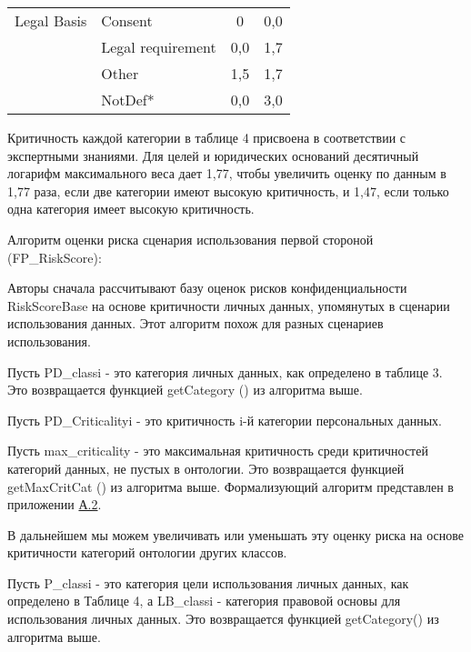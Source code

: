 \documentclass[../main]{subfiles}
\begin{document}
\begin{ltwrap}{2mm}{1.7}{\footnotesize}
\begin{longtable}[H]{|M{.15\x}|M{.3\x}|C{.15\x}|C{.15\x}|}
        Legal Basis
        & Consent
        & 0
        & 0,0\\
        

        & Legal requirement
        & 0,0
        & 1,7\\
        

        & Other
        & 1,5
        & 1,7\\
        

        & NotDef*
        & 0,0
        & 3,0\\\hline
        
    \end{longtable}
\end{ltwrap}

Критичность каждой категории в таблице 4 присвоена в соответствии с экспертными знаниями. Для целей и юридических оснований десятичный логарифм максимального веса дает 1,77, чтобы увеличить оценку по данным в 1,77 раза, если две категории имеют высокую критичность, и 1,47, если только одна категория имеет высокую критичность.

Алгоритм оценки риска сценария использования первой стороной (FP\_RiskScore):

Авторы сначала рассчитывают базу оценок рисков конфиденциальности RiskScoreBase на основе критичности личных данных, упомянутых в сценарии использования данных. Этот алгоритм похож для разных сценариев использования.

Пусть PD\_classi - это категория личных данных, как определено в таблице 3. Это возвращается функцией getCategory () из алгоритма выше.

Пусть PD\_Criticalityi - это критичность i-й категории персональных данных.

Пусть max\_criticality - это максимальная критичность среди критичностей категорий данных, не пустых в онтологии. Это возвращается функцией getMaxCritCat () из алгоритма выше. Формализующий алгоритм представлен в приложении \hyperref[sec:appendix12]{А.2}.

В дальнейшем мы можем увеличивать или уменьшать эту оценку риска на основе критичности категорий онтологии других классов. 

Пусть P\_classi - это категория цели использования личных данных, как определено в Таблице 4, а LB\_classi - категория правовой основы для использования личных данных. Это возвращается функцией getCategory() из алгоритма выше. 
\end{document}
